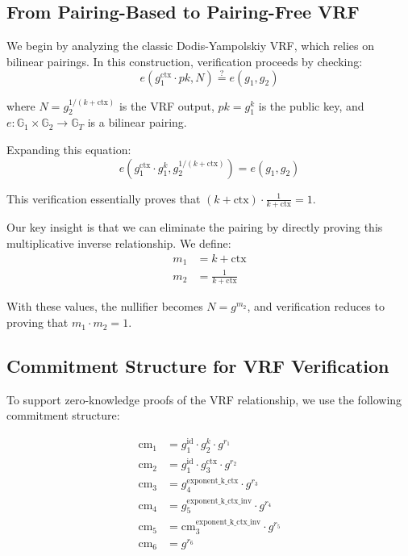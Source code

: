 \subsection{From Pairing-Based to Pairing-Free VRF}

We begin by analyzing the classic Dodis-Yampolskiy VRF, which relies on bilinear pairings. In this construction, verification proceeds by checking:
\[
e(g_1^{\text{ctx}} \cdot pk, N) \stackrel{?}{=} e(g_1, g_2)
\]

where $N = g_2^{1/(k+\text{ctx})}$ is the VRF output, $pk = g_1^k$ is the public key, and $e: \mathbb{G}_1 \times \mathbb{G}_2 \rightarrow \mathbb{G}_T$ is a bilinear pairing.

Expanding this equation:
\[
e(g_1^{\text{ctx}} \cdot g_1^k, g_2^{1/(k+\text{ctx})}) = e(g_1, g_2)
\]

This verification essentially proves that $(k+\text{ctx}) \cdot \frac{1}{k+\text{ctx}} = 1$.

Our key insight is that we can eliminate the pairing by directly proving this multiplicative inverse relationship. We define:
\begin{align}
m_1 &= k + \text{ctx} \\
m_2 &= \frac{1}{k+\text{ctx}}
\end{align}

With these values, the nullifier becomes $N = g^{m_2}$, and verification reduces to proving that $m_1 \cdot m_2 = 1$.

\subsection{Commitment Structure for VRF Verification}

To support zero-knowledge proofs of the VRF relationship, we use the following commitment structure:

\begin{align}
\text{cm}_1 &= g_1^{\text{id}} \cdot g_2^{k} \cdot g^{r_1} \\
\text{cm}_2 &= g_1^{\text{id}} \cdot g_3^{\text{ctx}} \cdot g^{r_2} \\
\text{cm}_3 &= g_4^{\text{exponent\_k\_ctx}} \cdot g^{r_3} \\
\text{cm}_4 &= g_5^{\text{exponent\_k\_ctx\_inv}} \cdot g^{r_4} \\
\text{cm}_5 &= \text{cm}_3^{\text{exponent\_k\_ctx\_inv}} \cdot g^{r_5} \\
\text{cm}_6 &= g^{r_6}
\end{align}

